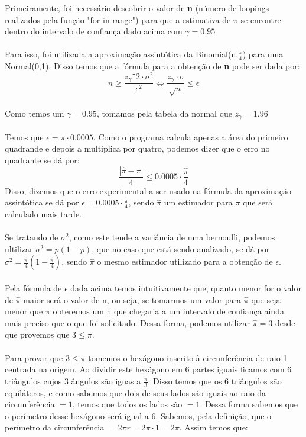 \documentclass{article}
\begin{document}
    Primeiramente, foi necessário descobrir o valor de \textbf{n} (número de loopings realizados pela função "for in range") para que a estimativa de $\pi$ se encontre dentro do intervalo de confiança dado acima com $\gamma = 0.95$\\
    \\
    Para isso, foi utilizada a aproximação assintótica da Binomial(n,$\frac{\pi}{4}$) para uma Normal(0,1). Disso temos que a fórmula para a obtenção de \textbf{n} pode ser dada por:\\
    $$n \geq \frac{z_\gamma¨2 \cdot \sigma^2}{\epsilon^2} \Leftrightarrow \frac{z_\gamma \cdot \sigma}{\sqrt{n}} \leq \epsilon $$
    \\
    Como temos um $\gamma=0.95$, tomamos pela tabela da normal que $z_\gamma = 1.96$\\
    \\
    Temos que $\epsilon = \pi \cdot0.0005$. Como o programa calcula apenas a área do primeiro quadrande e depois a multiplica por quatro, podemos dizer que o erro no quadrante se dá por:\\
    $$ \frac{|\hat{\pi}-\pi|}{4} \leq 0.0005\cdot \frac{\hat{\pi}}{4}$$
    Disso, dizemos que o erro experimental a ser usado na fórmula da aproximação assintótica se dá por
    $\epsilon = 0.0005\cdot \frac{\hat{\pi}}{4}$, sendo $\hat{\pi}$ um estimador para $\pi$ que será calculado mais tarde.\\
    \\
    Se tratando de $\sigma^2$, como este tende a variância de uma bernoulli, podemos ultilizar $\sigma^2 = p(1-p)$, que no caso que está sendo analizado, se dá por $\sigma^2 = \frac{\hat{\pi}}{4}(1-\frac{\hat{\pi}}{4})$, sendo $\hat{\pi}$ o mesmo estimador utilizado para a obtenção de $\epsilon$.\\
    \\
    Pela fórmula de $\epsilon$ dada acima temos intuitivamente que, quanto menor for o valor de $\hat{\pi}$ maior será o valor de n, ou seja, se tomarmos um valor para $\hat{\pi}$ que seja menor que $\pi$ obteremos um n que chegaria a um intervalo de confiança ainda mais preciso que o que foi solicitado. Dessa forma, podemos utilizar $\hat{\pi} = 3$ desde que provemos que $3 \leq \pi$.\\
    \\
    Para provar que $3\leq \pi$ tomemos o hexágono inscrito à circunferência de raio 1 centrada na origem. Ao dividir este hexágono em 6 partes iguais ficamos com 6 triângulos cujos 3 ângulos são iguas a $\frac{\pi}{3}$. Disso temos que os 6 triângulos são equiláteros, e como sabemos que dois de seus lados são iguais ao raio da circunferência $= 1$, temos que todos os lados são $= 1$. Dessa forma sabemos que o perímetro desse hexágono será igual a 6. Sabemos, pela definição, que o perímetro da circunferência $=2\pi r = 2\pi\cdot 1 = 2\pi$. Assim temos que:\\
\end{document}
